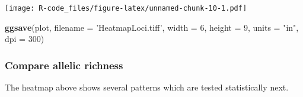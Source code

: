 \documentclass[]{article}
\newenvironment{Shaded}{\begin{snugshade}}{\end{snugshade}}
\newcommand{\KeywordTok}[1]{\textcolor[rgb]{0.13,0.29,0.53}{\textbf{#1}}}
\newcommand{\DataTypeTok}[1]{\textcolor[rgb]{0.13,0.29,0.53}{#1}}
\newcommand{\DecValTok}[1]{\textcolor[rgb]{0.00,0.00,0.81}{#1}}
\newcommand{\StringTok}[1]{\textcolor[rgb]{0.31,0.60,0.02}{#1}}
\newcommand{\NormalTok}[1]{#1}
\begin{document}
\texttt{[image: R-code\_files/figure-latex/unnamed-chunk-10-1.pdf]}

\begin{Shaded}
\begin{Highlighting}[]
\KeywordTok{ggsave}\NormalTok{(plot,}
       \DataTypeTok{filename =} \StringTok{'HeatmapLoci.tiff'}\NormalTok{,}
       \DataTypeTok{width =} \DecValTok{6}\NormalTok{,}
       \DataTypeTok{height =} \DecValTok{9}\NormalTok{,}
       \DataTypeTok{units =} \StringTok{"in"}\NormalTok{,}
       \DataTypeTok{dpi =} \DecValTok{300}\NormalTok{)}
\end{Highlighting}
\end{Shaded}

\subsubsection{Compare allelic richness}\label{compare-allelic-richness}

The heatmap above shows several patterns which are tested statistically
next.
\end{document}
